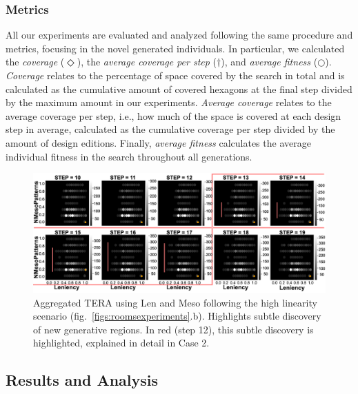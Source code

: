 \subsubsection{Metrics}

All our experiments are evaluated and analyzed following the same procedure and metrics, focusing in the novel generated individuals. In particular, we calculated the \textit{coverage} ($\Diamond$), the \textit{average coverage per step} ($\dagger$), and \textit{average fitness} ($\bigcirc$). \textit{Coverage} relates to the percentage of space covered by the search in total and is calculated as the cumulative amount of covered hexagons at the final step divided by the maximum amount in our experiments. \textit{Average coverage} relates to the average coverage per step, i.e., how much of the space is covered at each design step in average, calculated as the cumulative coverage per step divided by the amount of design editions. Finally, \textit{average fitness} calculates the average individual fitness in the search throughout all generations.




\begin{figure}[t!]
\centerline{\includegraphics[width=\textwidth]{figures/exp2-highlin-exploringchamber/accumulative__X-len-Y-mesoPat-simplify-2.png}}
\caption{Aggregated TERA using Len and Meso following the high linearity scenario (fig.~\ref{figs:roomsexperiments}.b). Highlights subtle discovery of new generative regions.  In red (step 12), this subtle discovery is highlighted, explained in detail in Case 2.}
\label{figs:exp2}
\end{figure}

\subsection{Results and Analysis}

